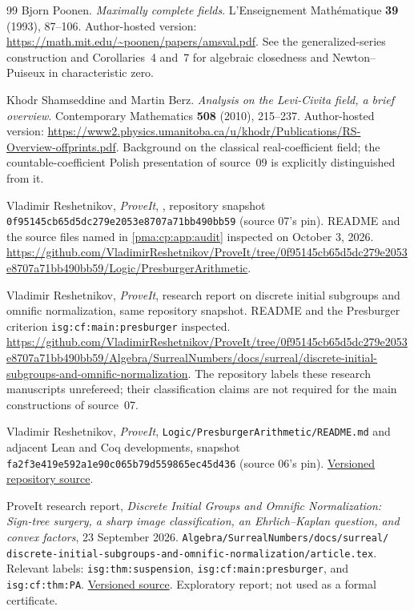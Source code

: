 \documentclass[11pt]{article}
\numberwithin{equation}{section}
\theoremstyle{definition}
\theoremstyle{remark}
\begin{document}
\begin{thebibliography}{99}
Bjorn Poonen.
\emph{Maximally complete fields}.
L'Enseignement Math\'ematique \textbf{39} (1993), 87--106.
Author-hosted version:
\url{https://math.mit.edu/~poonen/papers/amsval.pdf}.
See the generalized-series construction and Corollaries~4 and~7 for
algebraic closedness and Newton--Puiseux in characteristic zero.

Khodr Shamseddine and Martin Berz.
\emph{Analysis on the Levi-Civita field, a brief overview}.
Contemporary Mathematics \textbf{508} (2010), 215--237.
Author-hosted version:
\url{https://www2.physics.umanitoba.ca/u/khodr/Publications/RS-Overview-offprints.pdf}.
Background on the classical real-coefficient field; the countable-coefficient
Polish presentation of source~09 is explicitly distinguished from it.

Vladimir Reshetnikov, \emph{ProveIt},
, repository snapshot
\texttt{0f95145cb65d5dc279e2053e8707a71bb490bb59} (source 07's pin).
README and the source files named in \cref{pma:cp:app:audit} inspected
on October 3, 2026.
\url{https://github.com/VladimirReshetnikov/ProveIt/tree/0f95145cb65d5dc279e2053e8707a71bb490bb59/Logic/PresburgerArithmetic}.

Vladimir Reshetnikov, \emph{ProveIt},
research report on discrete initial subgroups and omnific normalization,
same repository snapshot. README and the Presburger criterion
\texttt{isg:cf:main:presburger} inspected.
\url{https://github.com/VladimirReshetnikov/ProveIt/tree/0f95145cb65d5dc279e2053e8707a71bb490bb59/Algebra/SurrealNumbers/docs/surreal/discrete-initial-subgroups-and-omnific-normalization}.
The repository labels these research manuscripts unrefereed; their
classification claims are not required for the main constructions of source~07.

Vladimir Reshetnikov, \emph{ProveIt},
\texttt{Logic/PresburgerArithmetic/README.md} and adjacent Lean and
Coq developments, snapshot
\texttt{fa2f3e419e592a1e90c065b79d559865ec45d436} (source 06's pin).
\href{https://github.com/VladimirReshetnikov/ProveIt/blob/fa2f3e419e592a1e90c065b79d559865ec45d436/Logic/PresburgerArithmetic/README.md}{Versioned repository source}.

ProveIt research report,
\emph{Discrete Initial Groups and Omnific Normalization:
Sign-tree surgery, a sharp image classification, an Ehrlich--Kaplan
question, and convex factors}, 23 September 2026.
\texttt{Algebra/SurrealNumbers/docs/surreal/}\allowbreak
\texttt{discrete-initial-subgroups-and-omnific-normalization/article.tex}.
Relevant labels:
\texttt{isg:thm:suspension},
\texttt{isg:cf:main:presburger}, and
\texttt{isg:cf:thm:PA}.
\href{https://github.com/VladimirReshetnikov/ProveIt/blob/fa2f3e419e592a1e90c065b79d559865ec45d436/Algebra/SurrealNumbers/docs/surreal/discrete-initial-subgroups-and-omnific-normalization/article.tex}{Versioned source}.
Exploratory report; not used as a formal certificate.


\end{thebibliography}
\end{document}
